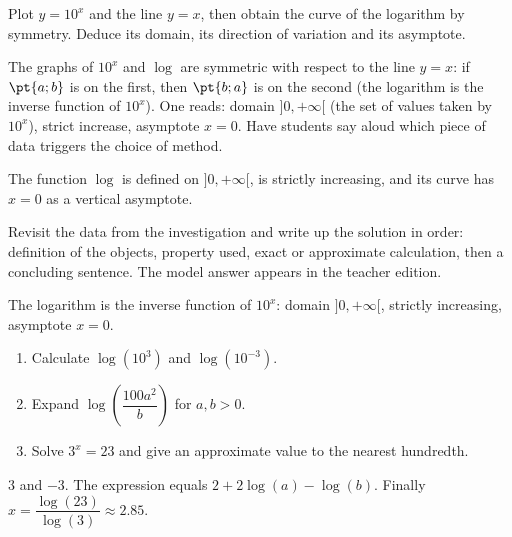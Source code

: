 \begin{activity}
Plot $y=10^x$ and the line $y=x$, then obtain the curve of the logarithm by symmetry. Deduce its domain, its direction of variation and its asymptote.
\begin{center}\end{center}
\end{activity}
\begin{solution}The graphs of $10^x$ and $\log$ are symmetric with respect to the line $y=x$: if $\pt{a;b}$ is on the first, then $\pt{b;a}$ is on the second (the logarithm is the inverse function of $10^x$). One reads: domain $]0,+\infty[$ (the set of values taken by $10^x$), strict increase, asymptote $x=0$. Have students say aloud which piece of data triggers the choice of method.\end{solution}

\begin{summary}The function $\log$ is defined on $]0,+\infty[$, is strictly increasing, and its curve has $x=0$ as a vertical asymptote.\end{summary}

\begin{example}
Revisit the data from the investigation and write up the solution in order: definition of the objects, property used, exact or approximate calculation, then a concluding sentence. The model answer appears in the teacher edition.
\end{example}
\begin{solution}The logarithm is the inverse function of $10^x$: domain $]0,+\infty[$, strictly increasing, asymptote $x=0$.\end{solution}

\begin{exercise}[essential]
\begin{enumerate}\item Calculate $\log(10^3)$ and $\log(10^{-3})$.\item Expand $\log\!\left(\dfrac{100a^2}{b}\right)$ for $a,b>0$.\item Solve $3^x=23$ and give an approximate value to the nearest hundredth.\end{enumerate}
\end{exercise}
\begin{solution}$3$ and $-3$. The expression equals $2+2\log(a)-\log(b)$. Finally $x=\dfrac{\log(23)}{\log(3)}\approx\num{2,85}$.\end{solution}

